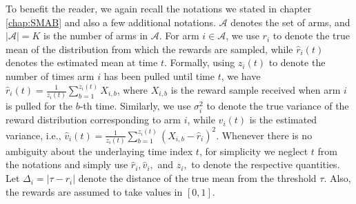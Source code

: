 To benefit the reader, we again recall the notations we stated in chapter \ref{chap:SMAB} and also a few additional notations. $\mathcal{A}$ denotes the set of arms, and $|\mathcal{A}|=K$ is the number of arms in $\mathcal{A}$. For arm $i\in\mathcal{A}$, we use $r_{i}$ to denote the true mean of the distribution from which the rewards are sampled, while $\hat{r}_{i}(t)$ denotes the estimated mean at time $t$. Formally, using $z_i(t)$ to denote the number of times arm $i$ has been pulled until time $t$, we have $\hat{r}_{i}(t)=\frac{1}{z_{i}(t)}\sum_{b=1}^{z_i(t)} X_{i,b}$, where $X_{i,b}$ is the reward sample received when arm $i$ is pulled for the $b$-th time. %
Similarly, we use $\sigma_{i}^{2}$ to denote the true variance of the reward distribution corresponding to arm $i$, while $\hat{v}_{i}(t)$ is the estimated variance, i.e., $\hat{v}_{i}(t)=\frac{1}{z_i(t)}\sum_{b=1}^{z_{i}(t)}(X_{i,b}-\hat{r}_{i})^{2}$. Whenever there is no ambiguity about the underlaying  time index $t$, for simplicity we neglect $t$ from the notations and simply use  $\hat{r}_i, \hat{v}_i,$ and $z_i, $ to denote the respective quantities.  Let  $\Delta_{i}=|\tau-r_{i}|$ denote the distance of the true mean from the threshold $\tau$. Also, the rewards are assumed to take values in $[0,1]$.


